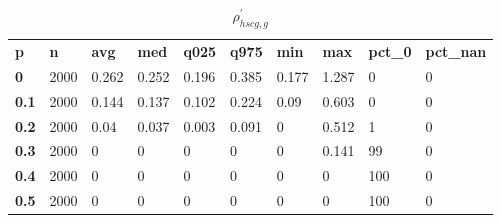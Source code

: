 \begin{table}[h]
 \centering 
\footnotesize
\caption{$\rho_{hscg,g}^\prime $}
\label{tab:alphahscgg}
\begin{tabular}[h]{| l l l l l l l l l l|
    } \hline
\textbf{ p} & \textbf{ n} & \textbf{ avg} & \textbf{ med} & \textbf{ q025} & \textbf{ q975} & \textbf{ min} & \textbf{ max} & \textbf{ pct\_0} & \textbf{ pct\_nan}
           \\
  \textbf{  0} & 2000 & 0.262 & 0.252 & 0.196 & 0.385 & 0.177 & 1.287 &   0 & 0
           \\
  \textbf{0.1} & 2000 & 0.144 & 0.137 & 0.102 & 0.224 &  0.09 & 0.603 &   0 & 0
           \\
  \textbf{0.2} & 2000 &  0.04 & 0.037 & 0.003 & 0.091 &     0 & 0.512 &   1 & 0
           \\
  \textbf{0.3} & 2000 &     0 &     0 &     0 &     0 &     0 & 0.141 &  99 & 0
           \\
  \textbf{0.4} & 2000 &     0 &     0 &     0 &     0 &     0 &     0 & 100 & 0
           \\
  \textbf{0.5} & 2000 &     0 &     0 &     0 &     0 &     0 &     0 & 100 & 0
           \\
 \hline \end{tabular}
 \end{table}
